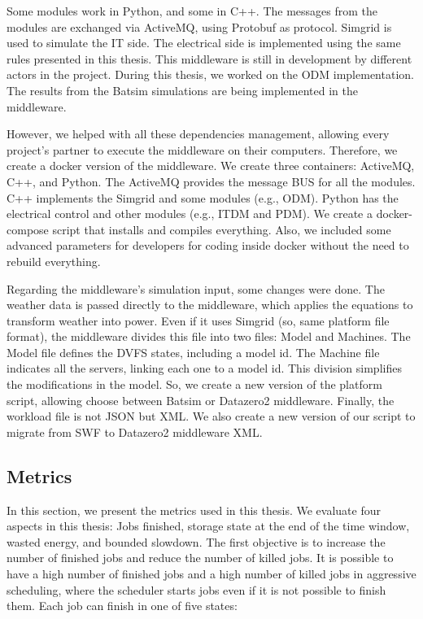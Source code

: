 Some modules work in Python, and some in C++. The messages from the modules are exchanged via ActiveMQ, using Protobuf as protocol. Simgrid is used to simulate the IT side. The electrical side is implemented using the same rules presented in this thesis. This middleware is still in development by different actors in the project. During this thesis, we worked on the ODM implementation. The results from the Batsim simulations are being implemented in the middleware. 

However, we helped with all these dependencies management, allowing every project's partner to execute the middleware on their computers. Therefore, we create a docker version of the middleware. We create three containers: ActiveMQ, C++, and Python. The ActiveMQ provides the message BUS for all the modules. C++ implements the Simgrid and some modules (e.g., ODM). Python has the electrical control and other modules (e.g., ITDM and PDM). We create a docker-compose script that installs and compiles everything. Also, we included some advanced parameters for developers for coding inside docker without the need to rebuild everything.

Regarding the middleware's simulation input, some changes were done. The weather data is passed directly to the middleware, which applies the equations to transform weather into power. Even if it uses Simgrid (so, same platform file format), the middleware divides this file into two files: Model and Machines. The Model file defines the DVFS states, including a model id. The Machine file indicates all the servers, linking each one to a model id. This division simplifies the modifications in the model. So, we create a new version of the platform script, allowing choose between Batsim or Datazero2 middleware. Finally, the workload file is not JSON but XML. We also create a new version of our script to migrate from SWF to Datazero2 middleware XML.

\subsection{Metrics}

In this section, we present the metrics used in this thesis. We evaluate four aspects in this thesis: Jobs finished, storage state at the end of the time window, wasted energy, and bounded slowdown. The first objective is to increase the number of finished jobs and reduce the number of killed jobs. It is possible to have a high number of finished jobs and a high number of killed jobs in aggressive scheduling, where the scheduler starts jobs even if it is not possible to finish them. Each job can finish in one of five states: 


